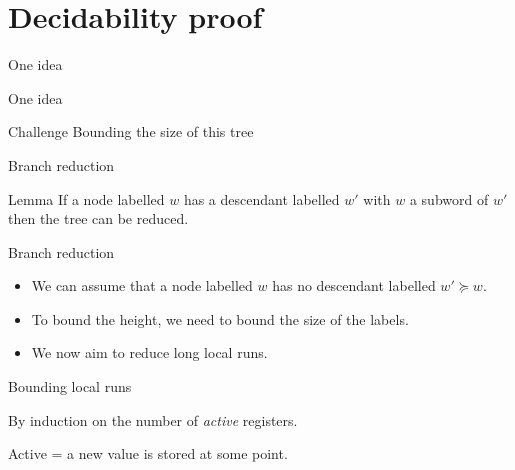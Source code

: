 \documentclass{beamer}
\begin{document}
\section{Decidability proof}


\begin{frame}{One idea}
	
	
	
\end{frame}

\begin{frame}{One idea}
	
	
	\begin{block}{Challenge}
		Bounding the size of this tree
	\end{block}
\end{frame}

\begin{frame}{Branch reduction}
	
	\begin{block}{Lemma}
		If a node labelled $w$ has a descendant labelled $w'$ with $w$ a subword of $w'$ then the tree can be reduced.
	\end{block}
	
	
\end{frame}

\begin{frame}{Branch reduction}
	\begin{itemize}
		\item We can assume that a node labelled $w$ has no descendant labelled $w' \succeq w$.
		
		\item To bound the height, we need to bound the size of the labels.
		
		\item We now aim to reduce long local runs.
	\end{itemize}
\end{frame}

\begin{frame}{Bounding local runs}
	
	
	By induction on the number of \color{blue}\emph{active }\color{black} registers.
	
	\color{purple}Active \color{black} = a new value is stored at some point.
	\vspace{0.5cm}
	
	
	
\end{frame}
\end{document}
